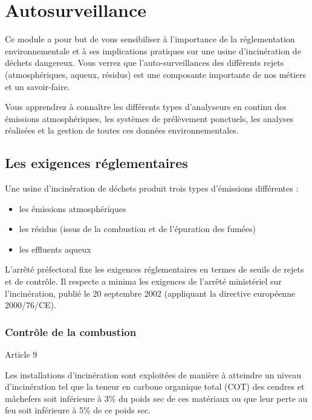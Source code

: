 \chapter{Autosurveillance}


Ce module a pour but de vous sensibiliser à l’importance de la réglementation environnementale et à ses implications pratiques sur une usine d’incinération de déchets dangereux. Vous verrez que l’auto-surveillances des différents rejets (atmosphériques, aqueux, résidus) est une composante importante de nos métiers et un savoir-faire.
\vspace{0.3cm}

Vous apprendrez à connaître les différents types d’analyseurs en continu des émissions atmosphériques, les systèmes de prélèvement ponctuels, les analyses réalisées et la gestion de toutes ces données environnementales.




\section{	Les exigences réglementaires}

Une usine d'incinération de déchets produit trois types d'émissions différentes : 
\begin{itemize}
\item	les émissions atmosphériques
\item	les résidus (issus de la combustion et de l'épuration des fumées)
\item	les effluents aqueux
\end{itemize}

L'arrêté préfectoral fixe les exigences réglementaires en termes de seuils de rejets et de contrôle.
Il respecte a minima les exigences de l'arrêté ministériel sur l'incinération, publié le 20 septembre 2002 (appliquant la directive européenne 2000/76/CE).

\subsection{Contrôle de la combustion}

\vspace{0.3cm}
Article 9
\vspace{0.3cm} 

\begin{tcolorbox}[colback=blue!5!white,colframe=blue!75!black]
Les installations d’incinération sont exploitées de manière à atteindre un niveau d’incinération tel que la teneur en carbone organique total (COT) des cendres et mâchefers soit inférieure à 3\% du poids sec de ces matériaux ou que leur perte au feu soit inférieure à 5\% de ce poids sec.
\end{tcolorbox}

